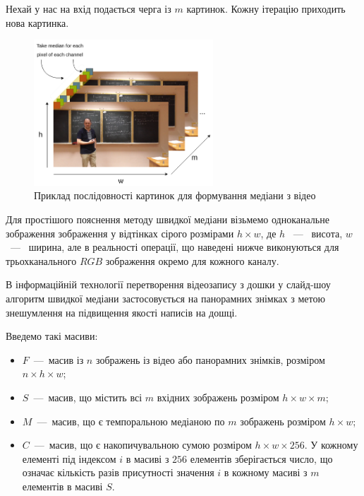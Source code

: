 Нехай у нас на вхід подається черга із $m$ картинок. Кожну ітерацію приходить нова картинка.
\begin{figure}[H]
    \centering
    \includegraphics[width=0.6\textwidth]{images/median_seq}
    \caption{Приклад послідовності картинок для формування медіани з відео \cite{yakovlev_numbers_theory_video}
        \label{fig:median_seq_example}
    }
\end{figure}
Для простішого пояснення методу швидкої медіани візьмемо одноканальне зображення
зображення у відтінках сірого розмірами $h \times w$, де $h$ ~---~ висота, $w$ ~---~ ширина,
але в реальності операції, що наведені нижче виконуються для трьохканального $RGB$ зображення
окремо для кожного каналу.

В інформаційній технології перетворення відеозапису з дошки у слайд-шоу
\cite{creating_slides_1} \cite{patent_board}
алгоритм швидкої медіани застосовується на панорамних знімках
з метою знешумлення на підвищення якості написів на дошці.

Введемо такі масиви:
\begin{itemize}
    \item $F$~---~масив із $n$ зображень із відео або панорамних знімків, розміром $n \times  h \times w$;
    \item $S$~---~масив, що містить  всі $m$ вхідних зображень розміром $h \times w \times m$;
    \item $M$~---~масив, що є темпоральною медіаною по $m$ зображень розміром $h \times w$;
    \item $C$~---~масив, що є накопичувальною сумою розміром $h \times w \times 256$. У кожному елементі під індексом $i$ в
          масиві з $256$ елементів зберігається число, що означає кількість разів присутності значення $i$ в кожному
          масиві з $m$ елементів в масиві $S$.
\end{itemize}

